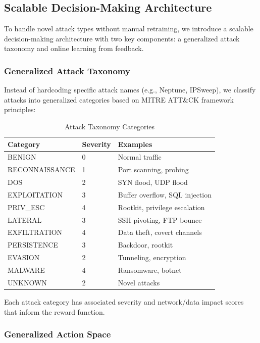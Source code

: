 \documentclass[conference]{IEEEtran}
\begin{document}
\subsection{Scalable Decision-Making Architecture}

To handle novel attack types without manual retraining, we introduce a scalable decision-making architecture with two key components: a generalized attack taxonomy and online learning from feedback.

\subsubsection{Generalized Attack Taxonomy}

Instead of hardcoding specific attack names (e.g., Neptune, IPSweep), we classify attacks into generalized categories based on MITRE ATT\&CK framework principles:

\begin{table}[htbp]
\centering
\caption{Attack Taxonomy Categories}
\begin{tabular}{lll}
\toprule
\textbf{Category} & \textbf{Severity} & \textbf{Examples} \\
\midrule
BENIGN & 0 & Normal traffic \\
RECONNAISSANCE & 1 & Port scanning, probing \\
DOS & 2 & SYN flood, UDP flood \\
EXPLOITATION & 3 & Buffer overflow, SQL injection \\
PRIV\_ESC & 4 & Rootkit, privilege escalation \\
LATERAL & 3 & SSH pivoting, FTP bounce \\
EXFILTRATION & 4 & Data theft, covert channels \\
PERSISTENCE & 3 & Backdoor, rootkit \\
EVASION & 2 & Tunneling, encryption \\
MALWARE & 4 & Ransomware, botnet \\
UNKNOWN & 2 & Novel attacks \\
\bottomrule
\end{tabular}
\end{table}

Each attack category has associated severity and network/data impact scores that inform the reward function.

\subsubsection{Generalized Action Space}
\end{document}
